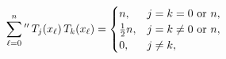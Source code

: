 \[\sideset{}{{}^{\prime\prime}}{\sum}_{\ell=0}^{n}\mathop{T_{j}\/}\nolimits\!%
\left(x_{\ell}\right)\mathop{T_{k}\/}\nolimits\!\left(x_{\ell}\right)=\begin{%
cases}n,&j=k=0\text{ or }n,\\
\frac{1}{2}n,&j=k\neq 0\text{ or }n,\\
0,&j\neq k,\end{cases}\]